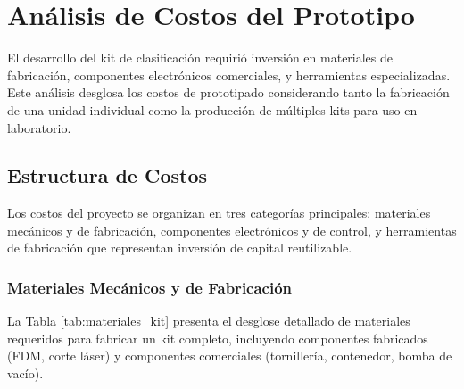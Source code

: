 \section{Análisis de Costos del Prototipo}

El desarrollo del kit de clasificación requirió inversión en materiales de fabricación, componentes electrónicos comerciales, y herramientas especializadas. Este análisis desglosa los costos de prototipado considerando tanto la fabricación de una unidad individual como la producción de múltiples kits para uso en laboratorio.

\subsection{Estructura de Costos}

Los costos del proyecto se organizan en tres categorías principales: materiales mecánicos y de fabricación, componentes electrónicos y de control, y herramientas de fabricación que representan inversión de capital reutilizable.

\subsubsection{Materiales Mecánicos y de Fabricación}

La Tabla \ref{tab:materiales_kit} presenta el desglose detallado de materiales requeridos para fabricar un kit completo, incluyendo componentes fabricados (FDM, corte láser) y componentes comerciales (tornillería, contenedor, bomba de vacío).

